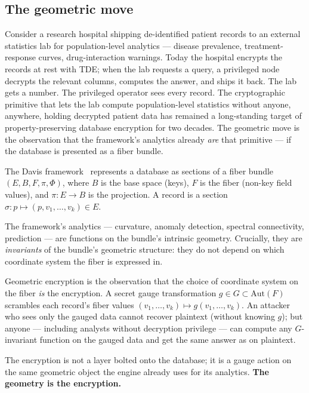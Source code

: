 \documentclass[11pt,letterpaper]{article}
\begin{document}
\subsection{The geometric move}
\label{sec:intro:geometric}

Consider a research hospital shipping de-identified patient records
to an external statistics lab for population-level analytics ---
disease prevalence, treatment-response curves, drug-interaction
warnings. Today the hospital encrypts the records at rest with
TDE; when the lab requests a query, a privileged node decrypts the
relevant columns, computes the answer, and ships it back. The lab
gets a number. The privileged operator sees every record. The
cryptographic primitive that lets the lab compute population-level
statistics without anyone, anywhere, holding decrypted patient
data has remained a long-standing target of property-preserving database
encryption for two decades. The geometric move is the observation
that the framework's analytics already \emph{are} that primitive
--- if the database is presented as a fiber bundle.

The Davis framework~\cite{davis2026sheafcomposition,davis2026manifold}
represents a database as sections of a fiber bundle
$(E, B, F, \pi, \Phi)$, where $B$ is the base space (keys), $F$ is the
fiber (non-key field values), and $\pi: E \to B$ is the projection. A
record is a section $\sigma: p \mapsto (p, v_1, \ldots, v_k) \in E$.

The framework's analytics --- curvature, anomaly detection, spectral
connectivity, prediction --- are functions on the bundle's intrinsic
geometry. Crucially, they are \emph{invariants} of the bundle's
geometric structure: they do not depend on which coordinate system the
fiber is expressed in.

Geometric encryption is the observation that the choice of coordinate
system on the fiber \emph{is} the encryption. A secret gauge
transformation $g \in G \subset \mathrm{Aut}(F)$ scrambles each
record's fiber values $(v_1, \ldots, v_k) \mapsto g(v_1, \ldots, v_k)$.
An attacker who sees only the gauged data cannot recover plaintext
(without knowing $g$); but anyone --- including analysts without
decryption privilege --- can compute any $G$-invariant function on the
gauged data and get the same answer as on plaintext.

The encryption is not a layer bolted onto the database; it is a
gauge action on the same geometric object the engine already
uses for its analytics. \textbf{The geometry is the encryption.}
\end{document}
